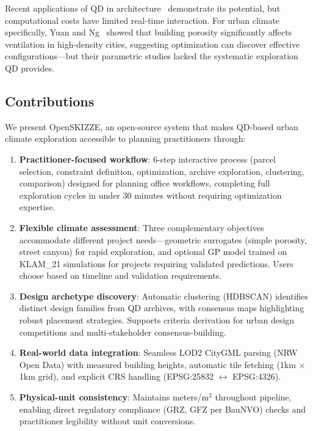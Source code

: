 \documentclass[times,final]{elsarticle}
\begin{document}
Recent applications of QD in architecture~\cite{hagg2021evolving} demonstrate its potential, but computational costs have limited real-time interaction. For urban climate specifically, Yuan and Ng~\cite{yuan2012building} showed that building porosity significantly affects ventilation in high-density cities, suggesting optimization can discover effective configurations—but their parametric studies lacked the systematic exploration QD provides.

\subsection{Contributions}

We present OpenSKIZZE, an open-source system that makes QD-based urban climate exploration accessible to planning practitioners through:

\begin{enumerate}
\item \textbf{Practitioner-focused workflow}: 6-step interactive process (parcel selection, constraint definition, optimization, archive exploration, clustering, comparison) designed for planning office workflows, completing full exploration cycles in under 30 minutes without requiring optimization expertise.

\item \textbf{Flexible climate assessment}: Three complementary objectives accommodate different project needs—geometric surrogates (simple porosity, street canyon) for rapid exploration, and optional GP model trained on KLAM\_21 simulations for projects requiring validated predictions. Users choose based on timeline and validation requirements.

\item \textbf{Design archetype discovery}: Automatic clustering (HDBSCAN) identifies distinct design families from QD archives, with consensus maps highlighting robust placement strategies. Supports criteria derivation for urban design competitions and multi-stakeholder consensus-building.

\item \textbf{Real-world data integration}: Seamless LOD2 CityGML parsing (NRW Open Data) with measured building heights, automatic tile fetching (1km $\times$ 1km grid), and explicit CRS handling (EPSG:25832 $\leftrightarrow$ EPSG:4326).

\item \textbf{Physical-unit consistency}: Maintains meters/m$^2$ throughout pipeline, enabling direct regulatory compliance (GRZ, GFZ per BauNVO) checks and practitioner legibility without unit conversions.
\end{enumerate}
\end{document}
